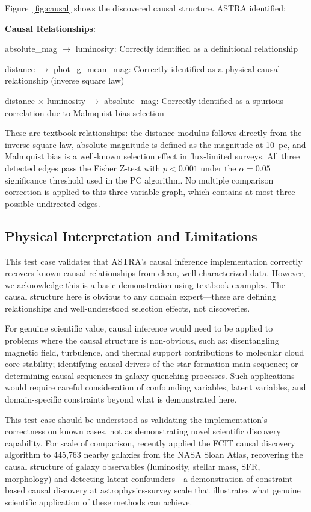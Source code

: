 \documentclass[usenatbib]{rasti}
\begin{document}
Figure~\ref{fig:causal} shows the discovered causal structure. ASTRA identified:

\textbf{Causal Relationships}:
\begin{description}
\item absolute\_mag $\to$ luminosity: Correctly identified as a definitional relationship
\item distance $\to$ phot\_g\_mean\_mag: Correctly identified as a physical causal relationship (inverse square law)
\item distance $\times$ luminosity $\to$ absolute\_mag: Correctly identified as a spurious correlation due to Malmquist bias selection
\end{description}

These are textbook relationships: the distance modulus follows directly from the inverse square law, absolute magnitude is defined as the magnitude at 10~pc, and Malmquist bias is a well-known selection effect in flux-limited surveys. All three detected edges pass the Fisher Z-test with $p < 0.001$ under the $\alpha = 0.05$ significance threshold used in the PC algorithm. No multiple comparison correction is applied to this three-variable graph, which contains at most three possible undirected edges.

\subsection{Physical Interpretation and Limitations}

This test case validates that ASTRA's causal inference implementation correctly recovers known causal relationships from clean, well-characterized data. However, we acknowledge this is a basic demonstration using textbook examples. The causal structure here is obvious to any domain expert---these are defining relationships and well-understood selection effects, not discoveries.

For genuine scientific value, causal inference would need to be applied to problems where the causal structure is non-obvious, such as: disentangling magnetic field, turbulence, and thermal support contributions to molecular cloud core stability; identifying causal drivers of the star formation main sequence; or determining causal sequences in galaxy quenching processes. Such applications would require careful consideration of confounding variables, latent variables, and domain-specific constraints beyond what is demonstrated here.

This test case should be understood as validating the implementation's correctness on known cases, not as demonstrating novel scientific discovery capability. For scale of comparison, \citet{desmond2026} recently applied the FCIT causal discovery algorithm to 445,763 nearby galaxies from the NASA Sloan Atlas, recovering the causal structure of galaxy observables (luminosity, stellar mass, SFR, morphology) and detecting latent confounders---a demonstration of constraint-based causal discovery at astrophysics-survey scale that illustrates what genuine scientific application of these methods can achieve.
\end{document}
